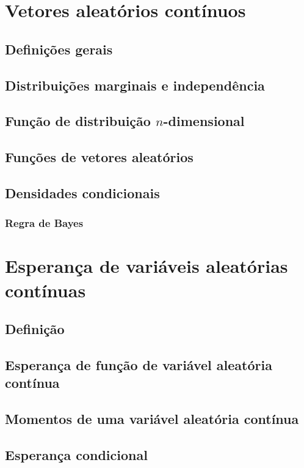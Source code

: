 \documentclass[../Notas.tex]{subfiles}
\begin{document}
\section{Vetores aleatórios contínuos}

\subsection{Definições gerais}

\subsection{Distribuições marginais e independência}

\subsection{Função de distribuição $n$-dimensional}

\subsection{Funções de vetores aleatórios}

\subsection{Densidades condicionais}

\subsubsection{Regra de Bayes}

\section{Esperança de variáveis aleatórias contínuas}

\subsection{Definição}

\subsection{Esperança de função de variável aleatória contínua}

\subsection{Momentos de uma variável aleatória contínua}

\subsection{Esperança condicional}
\end{document}
